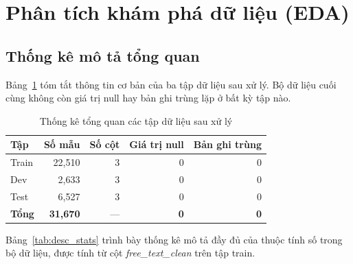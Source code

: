 \section{Phân tích khám phá dữ liệu (EDA)}
\label{sec:eda}
\subsection{Thống kê mô tả tổng quan}
Bảng~\ref{tab:overview} tóm tắt thông tin cơ bản của ba tập dữ liệu sau xử lý. Bộ dữ liệu cuối cùng không còn giá trị null hay bản ghi trùng lặp ở bất kỳ tập nào.

\begin{table}[H]
    \centering
    \caption{Thống kê tổng quan các tập dữ liệu sau xử lý}
    \label{tab:overview}
    \begin{tabular}{lrrrr}
        \hline
        \textbf{Tập}  & \textbf{Số mẫu} & \textbf{Số cột} & \textbf{Giá trị null} & \textbf{Bản ghi trùng} \\
        \hline
        Train         & 22,510          & 3               & 0                     & 0                      \\
        Dev           & 2,633           & 3               & 0                     & 0                      \\
        Test          & 6,527           & 3               & 0                     & 0                      \\
        \hline
        \textbf{Tổng} & \textbf{31,670} & —               & \textbf{0}            & \textbf{0}             \\
        \hline
    \end{tabular}
\end{table}

Bảng~\ref{tab:desc_stats} trình bày thống kê mô tả đầy đủ của thuộc tính số trong bộ dữ liệu, được tính từ cột \textit{free\_text\_clean} trên tập train.

